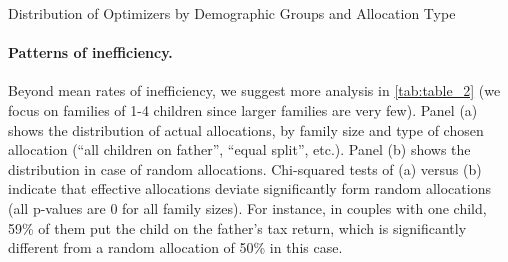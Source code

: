   \begin{table}[H]
  \caption{Distribution of Optimizers by Demographic Groups and Allocation Type}
  \label{tab:table_2}
  \end{table}

\paragraph{Patterns of inefficiency. }
Beyond mean rates of inefficiency, we suggest more analysis in \autoref{tab:table_2} (we focus on families of 1-4 children since larger families are very few). Panel (a) shows the distribution of actual allocations, by family size and type of chosen allocation (“all children on father”, “equal split”, etc.). Panel (b) shows the distribution in case of random allocations. Chi-squared tests of (a) versus (b) indicate that effective allocations deviate significantly form random allocations (all p-values are 0 for all family sizes). For instance, in couples with one child, 59\% of them put the child on the father’s tax return, which is significantly different from a random allocation of 50\% in this case. 




